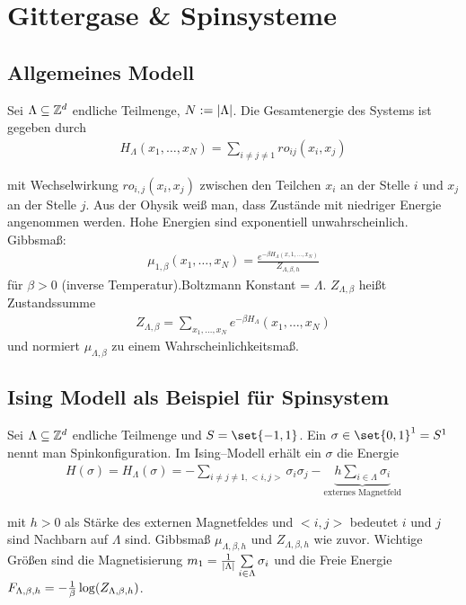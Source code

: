 
\section{Gittergase \& Spinsysteme}

\subsection{Allgemeines Modell}

Sei $\Lambda \subseteq \mathbb{Z}^d$ endliche Teilmenge, $N := \lvert\Lambda\rvert$. Die Gesamtenergie des Systems ist gegeben durch 
\begin{align}
	H_\Lambda (x_1, \dots, x_N) = \sum\limits_{i \neq j \neq 1} ro_{ij} (x_i,x_j)
\end{align}

mit Wechselwirkung $ro_{i,j}(x_i,x_j)$ zwischen den Teilchen $x_i$ an der Stelle $i$ und $x_j$ an der Stelle $j$. Aus der Ohysik weiß man, dass Zustände mit niedriger Energie angenommen werden. Hohe Energien sind exponentiell unwahrscheinlich. Gibbsmaß:
\begin{align}
	\mu_{1,\beta} (x_1, \dots, x_N) = \frac{e^{-\beta H_{\Lambda}(x,1,\dots, x_N)}}{Z_{\Lambda,\beta,h}}
\end{align}
für $\beta > 0$ (inverse Temperatur).Boltzmann Konstant = $\Lambda$. $Z_{\Lambda,\beta}$ heißt Zustandssumme 
\begin{align}
	Z_{\Lambda,\beta} = \sum\limits_{x_1,\dots,x_N} e^{-\beta H_{\Lambda}}(x_1,\dots, x_N)
\end{align}
und normiert $\mu_{\Lambda,\beta}$ zu einem Wahrscheinlichkeitsmaß.
 \subsection{Ising Modell als Beispiel für Spinsystem}
 Sei $\Lambda \subseteq \mathbb{Z}^d$ endliche Teilmenge und $S=\set{-1,1}$. Ein $\sigma \in \set{0,1}^1 = S^1$ nennt man Spinkonfiguration. Im Ising--Modell erhält ein $\sigma$ die Energie
 \begin{align}
 	H(\sigma) = H_{\Lambda} (\sigma) = - \sum\limits_{i \neq j \neq 1, <i,j>} \sigma_i \sigma_j - \underbrace{h \sum\limits_{i \in \Lambda} \sigma_i}_{\text{externes Magnetfeld}}
 \end{align} 
 
 mit $h>0$ als Stärke des externen Magnetfeldes und $<i,j>$ bedeutet $i$ und $j$ sind Nachbarn auf $\Lambda$ sind. Gibbsmaß $\mu_{\Lambda, \beta, h}$ und $Z_{\Lambda, \beta, h}$ wie zuvor.
 Wichtige Größen sind die Magnetisierung $m_1 = \frac{1}{\lvert\Lambda\rvert} \sum\limits_{i \in \Lambda} \sigma_i$ und die Freie Energie $F_{\Lambda, \beta, h} = -\frac{1}{\beta} \log \enb{Z_{\Lambda,\beta,h}}$.
 
